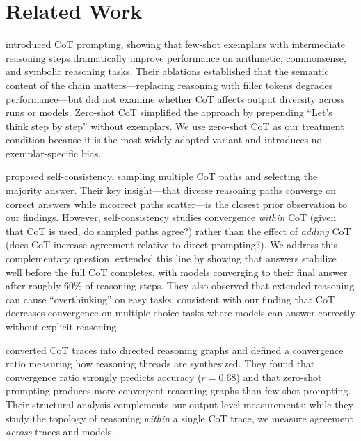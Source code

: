 \section{Related Work}
\label{sec:related}

 \citet{wei2022chain} introduced CoT prompting, showing that few-shot exemplars with intermediate reasoning steps dramatically improve performance on arithmetic, commonsense, and symbolic reasoning tasks. Their ablations established that the semantic content of the chain matters---replacing reasoning with filler tokens degrades performance---but did not examine whether CoT affects output diversity across runs or models. Zero-shot CoT \citep{kojima2022large} simplified the approach by prepending ``Let's think step by step'' without exemplars. We use zero-shot CoT as our treatment condition because it is the most widely adopted variant and introduces no exemplar-specific bias.

 \citet{wang2022self} proposed self-consistency, sampling multiple CoT paths and selecting the majority answer. Their key insight---that diverse reasoning paths converge on correct answers while incorrect paths scatter---is the closest prior observation to our findings. However, self-consistency studies convergence \emph{within} CoT (given that CoT is used, do sampled paths agree?) rather than the effect of \emph{adding} CoT (does CoT increase agreement relative to direct prompting?). We address this complementary question. \citet{liu2025answer} extended this line by showing that answers stabilize well before the full CoT completes, with models converging to their final answer after roughly 60\% of reasoning steps. They also observed that extended reasoning can cause ``overthinking'' on easy tasks, consistent with our finding that CoT decreases convergence on multiple-choice tasks where models can answer correctly without explicit reasoning.

 \citet{xiong2025mapping} converted CoT traces into directed reasoning graphs and defined a convergence ratio measuring how reasoning threads are synthesized. They found that convergence ratio strongly predicts accuracy ($r = 0.68$) and that zero-shot prompting produces more convergent reasoning graphs than few-shot prompting. Their structural analysis complements our output-level measurements: while they study the topology of reasoning \emph{within} a single CoT trace, we measure agreement \emph{across} traces and models.

